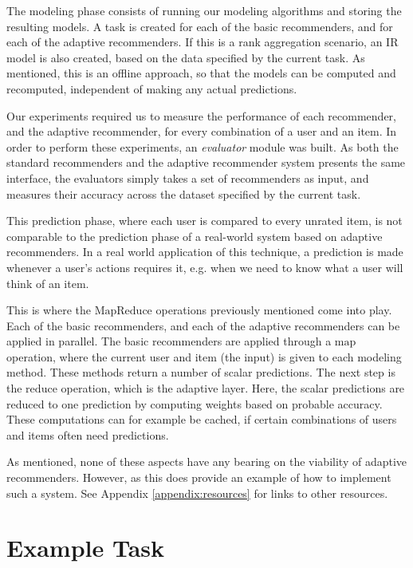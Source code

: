 The modeling phase consists of running our modeling algorithms and storing the resulting models.
A task is created for each of the basic recommenders, and for each of the adaptive recommenders.
If this is a rank aggregation scenario, an IR model is also created, based on the data
specified by the current task.
As mentioned, this is an offline approach, so that the models can be computed and recomputed,
independent of making any actual predictions.

Our experiments required us to measure the performance of each
recommender, and the adaptive recommender, for every combination of 
a user and an item.
In order to perform these experiments, an \emph{evaluator} module was built.
As both the standard recommenders and the adaptive recommender system presents the same 
interface, the evaluators simply takes a set of recommenders as input, 
and measures their accuracy across the dataset specified by the current task.

This prediction phase, where each user is compared to every unrated item,
is not comparable to the prediction phase of a real-world system
based on adaptive recommenders. In a real world application of this technique,
a prediction is made whenever a user's actions requires it,
e.g. when we need to know what a user will think of an item.

This is where the $\mathrm{MapReduce}$ operations previously mentioned come into play.
Each of the basic recommenders, and each of the adaptive recommenders can be applied in parallel.
The basic recommenders are applied through a $\mathrm{map}$ operation, where the current user and item (the input)
is given to each modeling method. These methods return a number of scalar predictions.
The next step is the $\mathrm{reduce}$ operation, which is the adaptive layer.
Here, the scalar predictions are reduced to one prediction by computing weights
based on probable accuracy.
These computations can for example be cached, if certain combinations of users and items
often need predictions.

As mentioned, none of these aspects have any bearing on the viability of adaptive recommenders.
However, as this does provide an example of how to implement such a system. 
See Appendix \ref{appendix:resources} for links to other resources. 


\section{Example Task}

